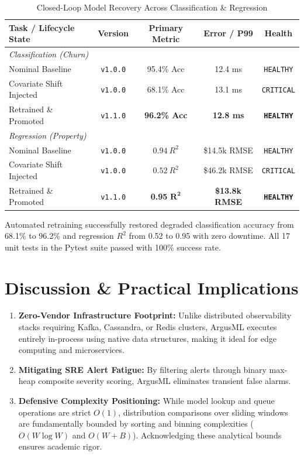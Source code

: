 \documentclass[conference]{IEEEtran}
\begin{document}
\begin{table}[htbp]
\caption{Closed-Loop Model Recovery Across Classification \& Regression}
\label{tab:recovery}
\begin{center}
\begin{tabular}{lcccc}
\toprule
\textbf{Task / Lifecycle State} & \textbf{Version} & \textbf{Primary Metric} & \textbf{Error / P99} & \textbf{Health} \\
\midrule
\textit{Classification (Churn)} & & & & \\
Nominal Baseline & \texttt{v1.0.0} & 95.4\% Acc & 12.4 ms & \texttt{HEALTHY} \\
Covariate Shift Injected & \texttt{v1.0.0} & 68.1\% Acc & 13.1 ms & \texttt{CRITICAL} \\
Retrained \& Promoted & \texttt{v1.1.0} & \textbf{96.2\% Acc} & \textbf{12.8 ms} & \textbf{\texttt{HEALTHY}} \\
\midrule
\textit{Regression (Property)} & & & & \\
Nominal Baseline & \texttt{v1.0.0} & $0.94\ R^2$ & \$14.5k RMSE & \texttt{HEALTHY} \\
Covariate Shift Injected & \texttt{v1.0.0} & $0.52\ R^2$ & \$46.2k RMSE & \texttt{CRITICAL} \\
Retrained \& Promoted & \texttt{v1.1.0} & \textbf{0.95} $\mathbf{R^2}$ & \textbf{\$13.8k RMSE} & \textbf{\texttt{HEALTHY}} \\
\bottomrule
\end{tabular}
\end{center}
\end{table}

Automated retraining successfully restored degraded classification accuracy from 68.1\% to 96.2\% and regression $R^2$ from 0.52 to 0.95 with zero downtime. All 17 unit tests in the Pytest suite passed with 100\% success rate.

\section{Discussion \& Practical Implications}
\begin{enumerate}
    \item \textbf{Zero-Vendor Infrastructure Footprint:} Unlike distributed observability stacks requiring Kafka, Cassandra, or Redis clusters, ArgusML executes entirely in-process using native data structures, making it ideal for edge computing and microservices.
    \item \textbf{Mitigating SRE Alert Fatigue:} By filtering alerts through binary max-heap composite severity scoring, ArgusML eliminates transient false alarms.
    \item \textbf{Defensive Complexity Positioning:} While model lookup and queue operations are strict $O(1)$, distribution comparisons over sliding windows are fundamentally bounded by sorting and binning complexities ($O(W \log W)$ and $O(W+B)$). Acknowledging these analytical bounds ensures academic rigor.
\end{enumerate}
\end{document}
